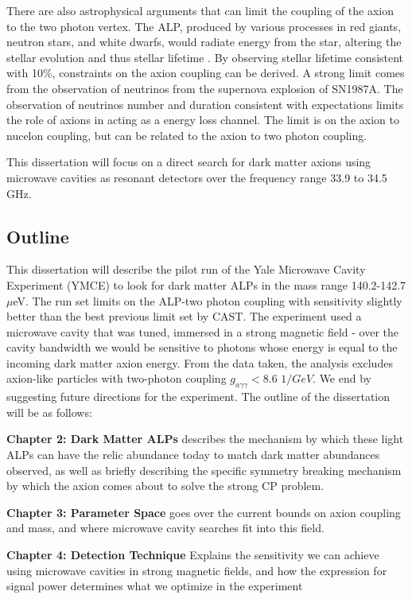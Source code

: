 \documentclass[12pt,twosides]{book}
\begin{document}
\begin{description}
There are also astrophysical arguments that can limit the coupling of the axion to the two photon vertex. The ALP, produced by various processes in red giants, neutron stars, and white dwarfs, would radiate energy from the star, altering the stellar evolution and thus stellar lifetime \cite{turner89}. By observing stellar lifetime consistent with 10$\%$, constraints on the axion coupling can be derived\cite{raffelt95}. A strong limit comes from the observation of neutrinos from the supernova explosion of SN1987A. The observation of neutrinos number and duration consistent with expectations limits the role of axions in acting as a energy loss channel. The limit is on the axion to nucelon coupling, but can be related to the axion to two photon coupling.

This dissertation will focus on a direct search for dark matter axions using microwave cavities as resonant detectors over the frequency range 33.9 to 34.5 GHz.

\subsection{Outline}

This dissertation will describe the pilot run of the Yale Microwave Cavity Experiment (YMCE) to look for dark matter ALPs in the mass range 140.2-142.7 $\mu$eV. The run set limits on the ALP-two photon coupling with sensitivity slightly better than the best previous limit set by CAST. The experiment used a microwave cavity that was tuned, immersed in a strong magnetic field - over the cavity bandwidth we would be sensitive to photons whose energy is equal to the incoming dark matter axion energy.  From the data taken, the analysis excludes axion-like particles with two-photon coupling $g_{a\gamma\gamma} < 8.6$ $1/GeV$. We end by suggesting future directions for the experiment.
The outline of the dissertation will be as follows:

\textbf{Chapter 2: Dark Matter ALPs} describes the mechanism by which these light ALPs can have the relic abundance today to match dark matter abundances observed, as well as briefly describing the specific symmetry breaking mechanism by which the axion comes about to solve the strong CP problem.

\textbf{Chapter 3: Parameter Space} goes over the current bounds on axion coupling and mass, and where microwave cavity searches fit into this field.

\textbf{Chapter 4: Detection Technique} Explains the sensitivity we can achieve using microwave cavities in strong magnetic fields, and how the expression for signal power determines what we optimize in the experiment


\end{description}
\end{document}
